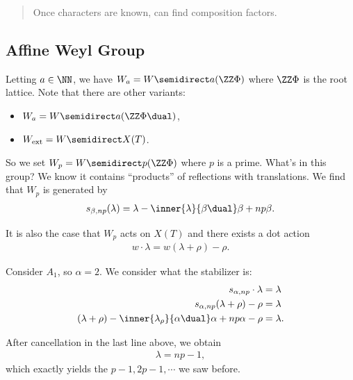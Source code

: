 \begin{quote}
Once characters are known, can find composition factors.
\end{quote}

\hypertarget{affine-weyl-group}{%
\subsection{Affine Weyl Group}\label{affine-weyl-group}}

Letting \(a\in \NN\), we have \(W_a = W\semidirect a(\ZZ\Phi)\) where
\(\ZZ\Phi\) is the root lattice. Note that there are other variants:

\begin{itemize}
\tightlist
\item
  \(W_a = W\semidirect a(\ZZ\Phi\dual)\),
\item
  \(W_{\text{ext}} = W \semidirect X(T)\).
\end{itemize}

So we set \(W_p = W\semidirect p(\ZZ\Phi)\) where \(p\) is a prime.
What's in this group? We know it contains ``products'' of reflections
with translations. We find that \(W_p\) is generated by
\begin{align*}  
s_{\beta, np}(\lambda) = \lambda - \inner{\lambda}{\beta\dual}\beta + np \beta
.\end{align*}

It is also the case that \(W_p\) acts on \(X(T)\) and there exists a dot
action
\begin{align*}  
w\cdot \lambda = w(\lambda + \rho) - \rho
.\end{align*}

\begin{example}

Consider \(A_1\), so \(\alpha = 2\). We consider what the stabilizer is:
\begin{align*}  
s_{\alpha, np}\cdot \lambda &= \lambda \\
s_{\alpha, np}(\lambda + \rho) - \rho &= \lambda \\
(\lambda + \rho) - \inner{\lambda _ \rho}{\alpha\dual}\alpha + np\alpha - \rho &= \lambda
.\end{align*}

After cancellation in the last line above, we obtain
\begin{align*}  
\lambda = np-1
,\end{align*} which exactly yields the \(p-1, 2p-1, \cdots\) we saw
before.

\end{example}

